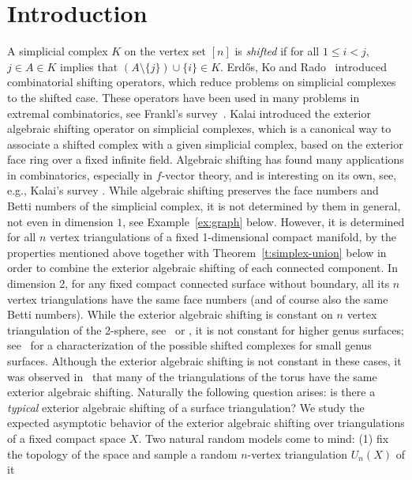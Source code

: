 \section{Introduction}
A simplicial complex $K$ on the vertex set $[n]$ is \emph{shifted} if for all $1\le i <j$,   $j\in A\in K$ implies that 
$(A\setminus \{j\})\cup \{i\} \in K$.
Erd\H{o}s, Ko and Rado~\cite{erdos61-intersection} introduced
combinatorial shifting operators, which reduce problems on simplicial complexes to the shifted case. These operators have been used 
in many problems in extremal combinatorics, see Frankl's survey~\cite{frankl87-shifting}. 
Kalai \cite{KalaiPart1} introduced the exterior algebraic shifting operator on simplicial complexes, which is a canonical way to associate a shifted complex with a given simplicial complex, based on the exterior face ring over a fixed infinite field. 
Algebraic shifting has found many applications in combinatorics, especially in $f$-vector theory, and is interesting on its own, see, e.g., Kalai's survey 
\cite{kalai02-shifting}.  
%
While algebraic shifting preserves the face numbers and Betti numbers of the  simplicial complex, it is not determined by them in general, not even in dimension $1$, see Example~\ref{ex:graph} below. However, it is determined for all $n$ vertex triangulations of a fixed 1-dimensional compact manifold, by the properties mentioned above together with Theorem~\ref{t:simplex-union} below in order to combine the exterior algebraic shifting of each connected component.
In dimension 2, 
for any fixed compact connected surface without boundary, all its $n$ vertex triangulations have the same face numbers (and of course also the same Betti numbers).
While the exterior algebraic shifting is constant on $n$ vertex triangulation of the 2-sphere, see~\cite[Sec.2.4]{kalai02-shifting} or \cite[Footnote 2]{keehn24-exterior}, it is not constant for higher genus surfaces; see~\cite{keehn24-exterior} for a characterization of the possible shifted complexes for small genus surfaces. 
Although the exterior algebraic shifting is not constant in these cases, it was observed in~\cite[Remarks 5.3]{keehn24-exterior} that many of the triangulations of the torus have the same exterior algebraic shifting. Naturally the following question arises: is there a \emph{typical} exterior algebraic shifting of a surface triangulation?
%
%
We study the expected asymptotic behavior of the exterior algebraic shifting  
over triangulations of a fixed compact space $X$.
Two natural random models come to mind:
(1)
fix the topology of the space and sample a random $n$-vertex triangulation $U_n(X)$ of it
